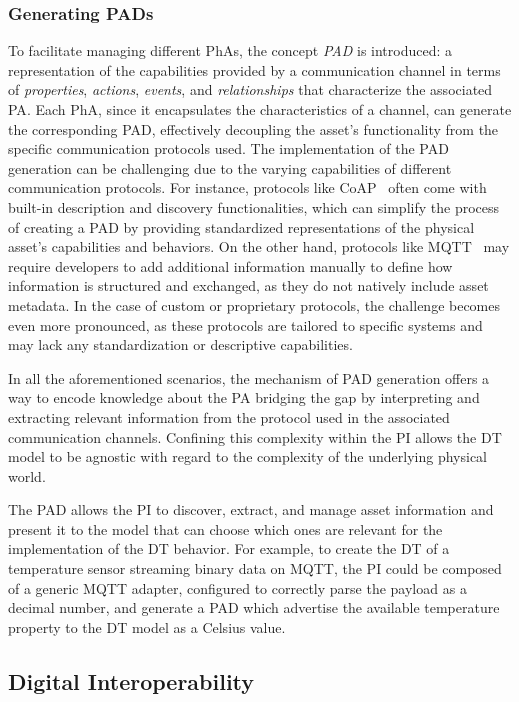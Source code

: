 \subsubsection{Generating \aclp{PAD}}
To facilitate managing different \acp{PhA}, the concept \emph{\ac{PAD}} is introduced: a representation of the capabilities provided by a communication channel in terms of \emph{properties}, \emph{actions}, \emph{events}, and \emph{relationships} that characterize the associated \ac{PA}.
%
Each \ac{PhA}, since it encapsulates the characteristics of a channel, can generate the corresponding \ac{PAD}, effectively decoupling the asset's functionality from the specific communication protocols used.
%
The implementation of the \ac{PAD} generation can be challenging due to the varying capabilities of different communication protocols.
For instance, protocols like \ac{CoAP}~\cite{RFC7252} often come with built-in description and discovery functionalities, which can simplify the process of creating a \ac{PAD} by providing standardized representations of the physical asset's capabilities and behaviors.
On the other hand, protocols like \ac{MQTT}~\cite{MQTTv5} may require developers to add additional information manually to define how information is structured and exchanged, as they do not natively include asset metadata.
In the case of custom or proprietary protocols, the challenge becomes even more pronounced, as these protocols are tailored to specific systems and may lack any standardization or descriptive capabilities.

In all the aforementioned scenarios, the mechanism of \ac{PAD} generation offers a way to encode knowledge about the \ac{PA} bridging the gap by interpreting and extracting relevant information from the protocol used in the associated communication channels.
%
Confining this complexity within the \ac{PI} allows the \ac{DT} model to be agnostic with regard to the complexity of the underlying physical world.

The \ac{PAD} allows the \ac{PI} to discover, extract, and manage asset information and present it to the model that can choose which ones are relevant for the implementation of the \ac{DT} behavior.
%
For example, to create the \ac{DT} of a temperature sensor streaming binary data on MQTT, the \ac{PI} could be composed of a generic MQTT adapter, configured to correctly parse the payload as a decimal number, and generate a \ac{PAD} which advertise the available temperature property to the \ac{DT} model as a Celsius value. 


\subsection{Digital Interoperability}
\label{sec:digital_interoperability}

